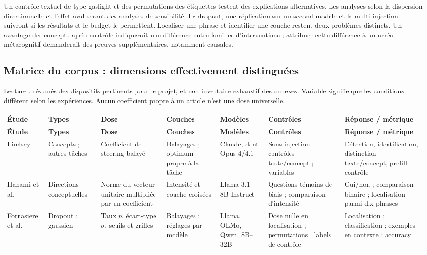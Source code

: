 \documentclass[10pt,a4paper]{article}
\begin{document}
Un contrôle textuel de type gaslight et des permutations des étiquettes testent des explications alternatives. Les analyses selon la dispersion directionnelle et l'effet aval seront des analyses de sensibilité. Le dropout, une réplication sur un second modèle et la multi-injection suivront si les résultats et le budget le permettent. Localiser une phrase et identifier une couche restent deux problèmes distincts. Un avantage des concepts après contrôle indiquerait une différence entre familles d'interventions ; attribuer cette différence à un accès métacognitif demanderait des preuves supplémentaires, notamment causales.

\clearpage
{}
\begin{landscape}
\section*{Matrice du corpus : dimensions effectivement distinguées}
\small
Lecture : résumés des dispositifs pertinents pour le projet, et non inventaire exhaustif des annexes. \og Variable\fg{} signifie que les conditions diffèrent selon les expériences. Aucun coefficient propre à un article n'est une dose universelle.
\small\setlength{\tabcolsep}{4pt}\renewcommand{\arraystretch}{1.12}
\begin{longtable}{@{}L{2.2cm}L{3.25cm}L{3.5cm}L{3.0cm}L{3.25cm}L{4.0cm}L{5.0cm}@{}}
\toprule
\textbf{Étude} & \textbf{Types} & \textbf{Dose} & \textbf{Couches} & \textbf{Modèles} & \textbf{Contrôles} & \textbf{Réponse / métrique}\\\midrule\endfirsthead
\toprule\textbf{Étude} & \textbf{Types} & \textbf{Dose} & \textbf{Couches} & \textbf{Modèles} & \textbf{Contrôles} & \textbf{Réponse / métrique}\\\midrule\endhead
\bottomrule\endfoot
Lindsey & Concepts ; autres tâches & Coefficient de steering balayé & Balayages ; optimum propre à la tâche & Claude, dont Opus 4/4.1 & Sans injection, contrôles texte/concept ; variables & Détection, identification, distinction texte/concept, prefill, contrôle\\\midrule
Hahami et al. & Directions conceptuelles & Norme du vecteur unitaire multipliée par un coefficient & Intensité et couche croisées & Llama-3.1-8B-Instruct & Questions témoins de biais ; comparaison d'intensité & Oui/non ; comparaison binaire ; localisation parmi dix phrases\\\midrule
Fornasiere et al. & Dropout ; gaussien & Taux $p$, écart-type $\sigma$, seuils et grilles & Balayages ; réglages par modèle & Llama, OLMo, Qwen, 8B--32B & Dose nulle en localisation ; permutations ; labels de contrôle & Localisation ; classification ; exemples en contexte ; accuracy\\\midrule

\end{longtable}
\end{landscape}
\end{document}
